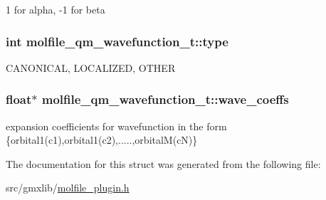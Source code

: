 1 for alpha, -\/1 for beta \hypertarget{structmolfile__qm__wavefunction__t_ac4aec71ed03be1d47745847ffb435009}{
\subsubsection[{type}]{\setlength{\rightskip}{0pt plus 5cm}int {\bf molfile\-\_\-qm\-\_\-wavefunction\-\_\-t\-::type}}}\label{structmolfile__qm__wavefunction__t_ac4aec71ed03be1d47745847ffb435009}
\-C\-A\-N\-O\-N\-I\-C\-A\-L, \-L\-O\-C\-A\-L\-I\-Z\-E\-D, \-O\-T\-H\-E\-R \hypertarget{structmolfile__qm__wavefunction__t_a9fbce35c7aa63a674152b34cf386ede6}{
\subsubsection[{wave\-\_\-coeffs}]{\setlength{\rightskip}{0pt plus 5cm}float$\ast$ {\bf molfile\-\_\-qm\-\_\-wavefunction\-\_\-t\-::wave\-\_\-coeffs}}}\label{structmolfile__qm__wavefunction__t_a9fbce35c7aa63a674152b34cf386ede6}
expansion coefficients for wavefunction in the form \{orbital1(c1),orbital1(c2),.....,orbital\-M(c\-N)\} 

\-The documentation for this struct was generated from the following file\-:\begin{DoxyCompactItemize}
\item 
src/gmxlib/\hyperlink{molfile__plugin_8h}{molfile\-\_\-plugin.\-h}\end{DoxyCompactItemize}
